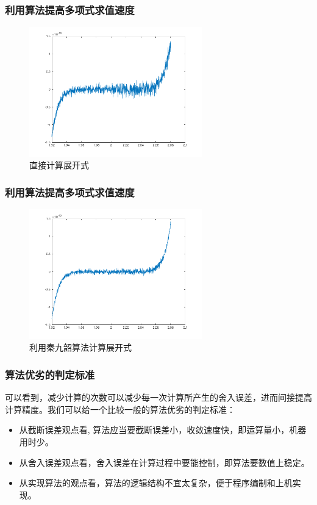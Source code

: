 \documentclass[10pt]{beamer}
\begin{document}
\begin{frame}
\frametitle{利用算法提高多项式求值速度}
\begin{figure}
\includegraphics[width=7.5cm]{figs/f_direct.png} 
\caption{直接计算展开式} 
\end{figure}

\end{frame}

\begin{frame}
\frametitle{利用算法提高多项式求值速度}
\begin{figure}
\includegraphics[width=7.5cm]{figs/f_nest.png} 
\caption{利用秦九韶算法计算展开式 } 
\end{figure}

\end{frame}

\begin{frame}
\frametitle{算法优劣的判定标准}
可以看到，减少计算的次数可以减少每一次计算所产生的舍入误差，进而间接提高计算精度。我们可以给一个比较一般的算法优劣的判定标准：
\begin{itemize}
\item 从截断误差观点看, 算法应当要截断误差小，收敛速度快，即运算量小，机器用时少。
\item 从舍入误差观点看，舍入误差在计算过程中要能控制，即算法要数值上稳定。
\item 从实现算法的观点看，算法的逻辑结构不宜太复杂，便于程序编制和上机实现。
\end{itemize}

\end{frame}
\end{document}
